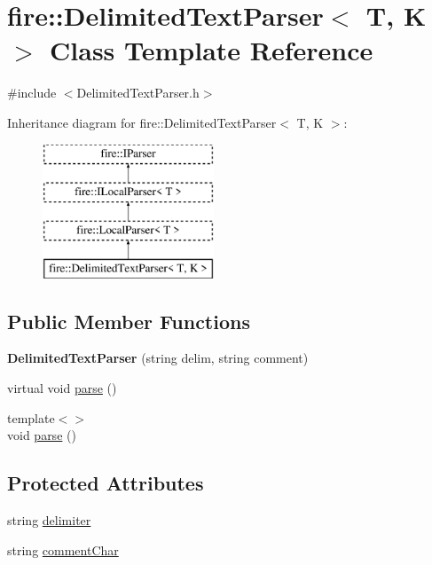 \hypertarget{a00075}{}\section{fire\+:\+:Delimited\+Text\+Parser$<$ T, K $>$ Class Template Reference}
\label{a00075}


{\ttfamily \#include $<$Delimited\+Text\+Parser.\+h$>$}

Inheritance diagram for fire\+:\+:Delimited\+Text\+Parser$<$ T, K $>$\+:\begin{figure}[H]
\begin{center}
\leavevmode
\includegraphics[height=4.000000cm]{a00075}
\end{center}
\end{figure}
\subsection*{Public Member Functions}
\begin{DoxyCompactItemize}
\item 
{\bfseries Delimited\+Text\+Parser} (string delim, string comment)\hypertarget{a00075_aa1f041ebbf0bf72145e8bd20bf95f3f4}{}\label{a00075_aa1f041ebbf0bf72145e8bd20bf95f3f4}

\item 
virtual void \hyperlink{a00075_a686df5548771cae833d5e721442a821a}{parse} ()
\item 
{\footnotesize template$<$$>$ }\\void \hyperlink{a00075_a773fa7ed28cb9d8c384ad94bd81fc93f}{parse} ()
\end{DoxyCompactItemize}
\subsection*{Protected Attributes}
\begin{DoxyCompactItemize}
\item 
string \hyperlink{a00075_ac817fc333b53611a41f446977461bdbf}{delimiter}
\item 
string \hyperlink{a00075_acdd7b27b8109ed41e7d9bc5e6de72e93}{comment\+Char}
\end{DoxyCompactItemize}


